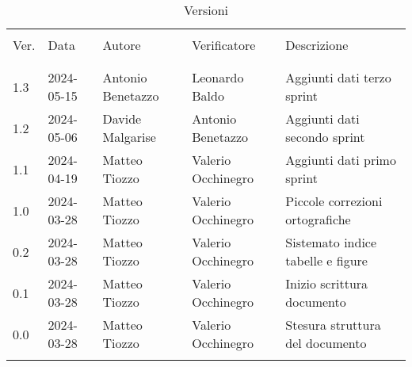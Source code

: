 \documentclass[12pt]{article} %
\begin{document}


\newpage



\begin{table}[!h]
	\footnotesize
	\begin{center}
		\caption*{Versioni}
		\vspace{0.5cm}
		\begin{tabular}{ l l l l p{6cm} }
			\hline                                                                                          \\[-2ex]
			Ver. & Data       & Autore             & Verificatore       & Descrizione                       \\
			\\[-2ex] \hline \\[-1.5ex]
			1.3  & 2024-05-15 & Antonio Benetazzo  & Leonardo Baldo     & Aggiunti dati terzo sprint        \\
			1.2  & 2024-05-06 & Davide Malgarise   & Antonio Benetazzo  & Aggiunti dati secondo sprint      \\
			1.1  & 2024-04-19 & Matteo Tiozzo      & Valerio Occhinegro & Aggiunti dati primo sprint        \\
			1.0  & 2024-03-28 & Matteo Tiozzo      & Valerio Occhinegro & Piccole correzioni ortografiche   \\
			0.2  & 2024-03-28 & Matteo Tiozzo      & Valerio Occhinegro & Sistemato indice tabelle e figure \\
			0.1  & 2024-03-28 & Matteo Tiozzo      & Valerio Occhinegro & Inizio scrittura documento        \\
			0.0  & 2024-03-28 & Matteo Tiozzo      & Valerio Occhinegro & Stesura struttura del documento   \\
			\\[-1.5ex] \hline
		\end{tabular}
	\end{center}
\end{table}

\newpage

\tableofcontents

\newpage

\listoftables

\listoffigures

\newpage



\newpage



\newpage



\newpage



\newpage


\end{document}
